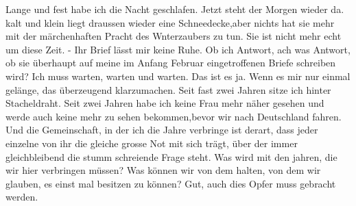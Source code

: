 \def\day{am 13. April}
\mktitle

Lange und fest habe ich die Nacht geschlafen.
Jetzt steht der Morgen wieder da.
kalt und klein liegt draussen wieder eine Schneedecke,aber nichts hat sie mehr mit der m\"{a}rchenhaften Pracht des Wnterzaubers zu tun.
Sie ist nicht mehr echt um diese Zeit.
- Ihr Brief l\"{a}sst mir keine Ruhe.
Ob ich Antwort, ach was Antwort, ob sie \"{u}berhaupt auf meine im Anfang Februar eingetroffenen Briefe schreiben wird?
Ich muss warten, warten und warten.
Das ist es ja.
Wenn es mir nur einmal gel\"{a}nge, das \"{u}berzeugend klarzumachen.
Seit fast zwei Jahren sitze ich hinter Stacheldraht.
Seit zwei Jahren habe ich keine Frau mehr n\"{a}her gesehen und werde auch keine mehr zu sehen bekommen,bevor wir nach Deutschland fahren.
Und die Gemeinschaft, in der ich die Jahre verbringe ist derart, dass jeder einzelne von ihr die gleiche grosse Not mit sich tr\"{a}gt, \"{u}ber der immer gleichbleibend die stumm schreiende Frage steht.
Was wird mit den jahren, die wir hier verbringen m\"{u}ssen?
Was k\"{o}nnen wir von dem halten, von dem wir glauben, es einst mal besitzen zu k\"{o}nnen?
Gut, auch dies Opfer muss gebracht werden.


\clearpage
